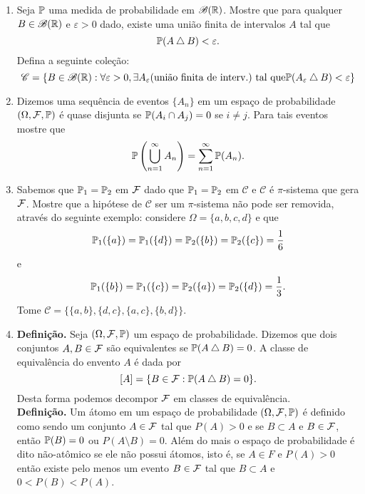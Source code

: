 \begin{enumerate}[leftmargin=*]
\item 
Seja $\P$ uma medida de probabilidade em $\mathscr{B}(\R)$.
Mostre que para qualquer $B\in \mathscr{B}(\R)$ e $\varepsilon>0$ 
dado, existe uma união finita de intervalos $A$ tal que 
	\[
		\P(A\bigtriangleup B) < \varepsilon.
	\]
 Defina a seguinte coleção:
\[ 
	\mathscr{C}
	=
	\{
		B\in\mathscr{B}(\R): \forall \varepsilon>0,
		\exists A_{\varepsilon} (\text{união finita de interv.})
		\ \text{tal que} \P(A_{\varepsilon} \bigtriangleup B)<\varepsilon
	\}
\]



\item 
Dizemos uma sequência de eventos $\{A_n\}$ 
em um espaço de probabilidade
$(\Omega,\F,\P)$ é quase disjunta se 
$\P(A_i\cap A_j)=0$ se $i\neq j$. 
Para tais eventos mostre que 
\[
	\P\left( \bigcup_{n=1}^{\infty} A_n \right)
	=
	\sum_{n=1}^{\infty} \P(A_n).
\]







\item Sabemos que $\P_1=\P_2$ em $\F$ dado que $\P_1=\P_2$
em $\mathcal{C}$ e $\mathcal{C}$ é $\pi$-sistema 
que gera $\F$. 
Mostre que a hipótese de $\mathcal{C}$ ser um $\pi$-sistema
não pode ser removida, através do seguinte exemplo:
considere $\Omega=\{a,b,c,d\}$ e que 
\[
	\P_1(\{a\}) = \P_1(\{d\}) = \P_2(\{b\}) = \P_2(\{c\}) = \frac{1}{6}
\]
e
\[
	\P_1(\{b\}) = \P_1(\{c\}) = \P_2(\{a\}) = \P_2(\{d\}) = \frac{1}{3}.
\]
Tome $\mathcal{C}=\{ \{a,b\}, \{d,c\}, \{a,c\}, \{b,d\} \}$.












\item 
{\bf Definição.} 
Seja $(\Omega,\F,\P)$ um espaço de probabilidade. 
Dizemos que dois conjuntos $A,B\in \F$ são equivalentes
se $\P(A\bigtriangleup B)=0$. A classe de equivalência
do envento $A$ é dada por 
\[ 
	[A] = \{B\in \F: \P(A \bigtriangleup B)=0 \}.
\]
Desta forma podemos decompor $\F$ em classes de equivalência.
\\
{\bf Definição.} Um átomo  em um espaço 
de probabilidade $(\Omega,\F,\P)$ é definido como sendo
um conjunto $A\in\F$ tal que $P(A)>0$ e se 
$B\subset A$ e $B\in \F$, então $\P(B)=0$ ou 
$P(A\setminus B)=0$. 
Além do mais o espaço de probabilidade é dito não-atômico
se ele não possui átomos, isto é, se $A\in F$ e 
$P(A)>0$ então existe pelo menos um evento $B\in \F$ tal que
$B\subset A$ e $0<P(B)<P(A)$.


\end{enumerate}
